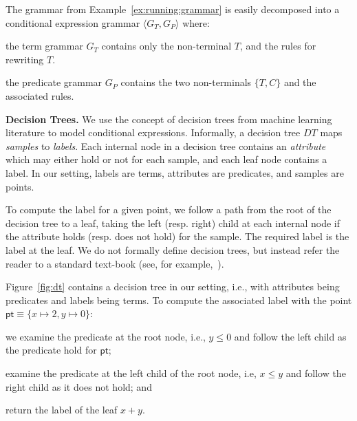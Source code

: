 \documentclass{llncs}
\newcommand\tuple[1]{\langle #1 \rangle}
\newcommand\Point{\mathsf{pt}}
\newcommand\Grammar{G}
\newcommand\DecisionTree{\mathit{DT}}
\renewcommand{\paragraph}[1]{\par\noindent\textbf{#1.}}
\begin{document}
\begin{example}
  The grammar from Example~\ref{ex:running:grammar} is easily decomposed
  into a conditional expression grammar $\tuple{\Grammar_T, \Grammar_P}$
  where:
  \begin{inparaenum}[(a)]
  \item the term grammar $\Grammar_T$ contains only the non-terminal
    $T$, and the rules for rewriting $T$.
  \item the predicate grammar $\Grammar_P$ contains the two
    non-terminals $\{ T, C \}$ and the associated rules.
  \end{inparaenum}
\end{example}

\paragraph{Decision Trees}
We use the concept of decision trees from machine learning literature to
model conditional expressions.
Informally, a decision tree $\DecisionTree$ maps {\em samples} to {\em
labels}.
Each internal node in a decision tree contains an {\em attribute} which
may either hold or not for each sample, and each leaf node contains a
label.
In our setting, labels are terms, attributes are predicates, and samples
are points.

To compute the label for a given point, we follow a path from the root
of the decision tree to a leaf, taking the left (resp. right) child at
each internal node if the attribute holds (resp.  does not hold) for the
sample.
The required label is the label at the leaf.
We do not formally define decision trees, but instead refer the reader
to a standard text-book (see, for example,~\cite{bishop-book}).

\begin{example}
  Figure~\ref{fig:dt} contains a decision tree in our setting, i.e.,
  with attributes being predicates and labels being terms.
  To compute the associated label with the point $\Point \equiv \{ x
  \mapsto 2, y \mapsto 0 \}$:
  \begin{inparaenum}[(a)]
  \item we examine the predicate at the root node, i.e., $y \leq 0$ and
    follow the left child as the predicate hold for $\Point$;
  \item examine the predicate at the left child of the root node, i.e,
    $x \leq y$ and follow the right child as it does not hold; and
  \item return the label of the leaf $x + y$.
  \end{inparaenum}
\end{example}
\end{document}
